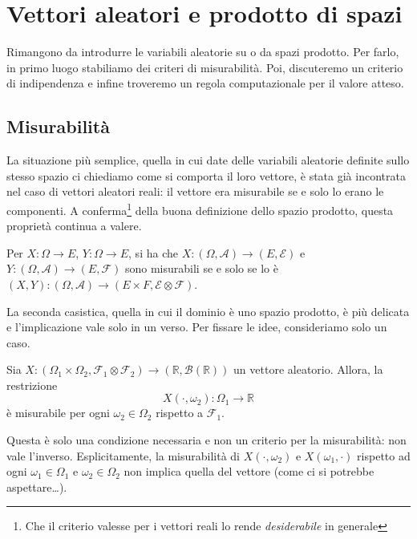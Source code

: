 \section{Vettori aleatori e prodotto di spazi}

Rimangono da introdurre le variabili aleatorie su o da spazi prodotto. Per farlo, in primo luogo stabiliamo dei criteri di misurabilità. Poi, discuteremo un criterio di indipendenza e infine troveremo un regola computazionale per il valore atteso.

\subsection{Misurabilità}

La situazione più semplice, quella in cui date delle variabili aleatorie definite sullo stesso spazio ci chiediamo come si comporta il loro vettore, è stata già incontrata nel caso di vettori aleatori reali: il vettore era misurabile se e solo lo erano le componenti. 
A conferma\footnote{Che il criterio valesse per i vettori reali lo rende \textit{desiderabile} in generale} della buona definizione dello spazio prodotto, questa proprietà continua a valere.
\begin{my_lemma}
	Per $X: \Omega \to E$, $Y: \Omega \to E$, si ha che $X:(\Omega,\mathcal{A}) \to (E,\mathcal{E})$ e $Y:(\Omega,\mathcal{A}) \to (E,\mathcal{F})$ sono misurabili se e solo se lo è $(X,Y):(\Omega,\mathcal{A}) \to (E \times F,\mathcal{E} \otimes \mathcal{F})$.
\end{my_lemma}

La seconda casistica, quella in cui il dominio è uno spazio prodotto, è più delicata e l'implicazione vale solo in un verso. 
Per fissare le idee, consideriamo solo un caso.
\begin{my_lemma}
	Sia $X : (\Omega_1 \times \Omega_2, \mathcal{F}_1 \otimes \mathcal{F}_2) \to (\mathbb{R}, \mathcal{B}(\mathbb{R}))$ un vettore aleatorio. Allora, la restrizione
	\[
		X(\boldsymbol{\cdot},\omega_2):\Omega_1 \to \mathbb{R}
	\]
	è misurabile per ogni $\omega_2 \in \Omega_2$ rispetto a $\mathcal{F}_1$.
\end{my_lemma}
Questa è solo una condizione necessaria e non un criterio per la misurabilità: non vale l'inverso. 
Esplicitamente, la misurabilità di $X(\cdot,\omega_2)$ e $X(\omega_1, \cdot)$ rispetto ad ogni $\omega_1 \in \Omega_1$ e $\omega_2 \in \Omega_2$ non implica quella del vettore (come ci si potrebbe aspettare\dots).

